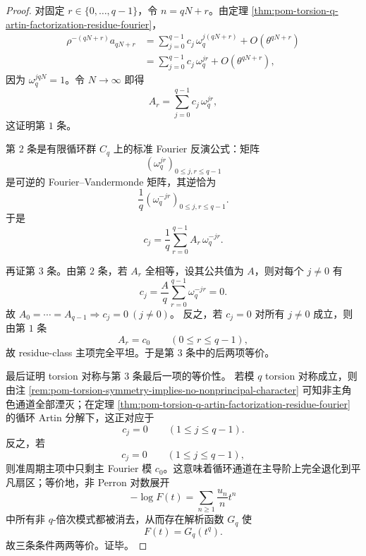 \begin{proof}
对固定 \(r\in\{0,\dots,q-1\}\)，令 \(n=qN+r\)。由定理 \ref{thm:pom-torsion-q-artin-factorization-residue-fourier}，
\[
\begin{aligned}
\rho^{-(qN+r)}a_{qN+r}
&=
\sum_{j=0}^{q-1}c_j\,\omega_q^{j(qN+r)}
+O(\theta^{qN+r})\\
&=
\sum_{j=0}^{q-1}c_j\,\omega_q^{jr}
+O(\theta^{qN+r}),
\end{aligned}
\]
因为 \(\omega_q^{jqN}=1\)。令 \(N\to\infty\) 即得
\[
A_r=\sum_{j=0}^{q-1}c_j\,\omega_q^{jr},
\]
这证明第 \(1\) 条。

第 \(2\) 条是有限循环群 \(C_q\) 上的标准 Fourier 反演公式：矩阵
\[
(\omega_q^{jr})_{0\le j,r\le q-1}
\]
是可逆的 Fourier--Vandermonde 矩阵，其逆恰为
\[
\frac1q(\omega_q^{-jr})_{0\le j,r\le q-1}.
\]
于是
\[
c_j=\frac1q\sum_{r=0}^{q-1}A_r\,\omega_q^{-jr}.
\]

再证第 \(3\) 条。由第 \(2\) 条，若 \(A_r\) 全相等，设其公共值为 \(A\)，则对每个 \(j\neq 0\) 有
\[
c_j=\frac{A}{q}\sum_{r=0}^{q-1}\omega_q^{-jr}=0.
\]
故 \(A_0=\cdots=A_{q-1}\Rightarrow c_j=0\ (j\neq0)\)。
反之，若 \(c_j=0\) 对所有 \(j\neq 0\) 成立，则由第 \(1\) 条
\[
A_r=c_0
\qquad(0\le r\le q-1),
\]
故 residue-class 主项完全平坦。于是第 \(3\) 条中的后两项等价。

最后证明 torsion 对称与第 \(3\) 条最后一项的等价性。
若模 \(q\) torsion 对称成立，则由注
\ref{rem:pom-torsion-symmetry-implies-no-nonprincipal-character}
可知非主角色通道全部湮灭；在定理
\ref{thm:pom-torsion-q-artin-factorization-residue-fourier}
的循环 Artin 分解下，这正对应于
\[
c_j=0\qquad(1\le j\le q-1).
\]
反之，若
\[
c_j=0\qquad(1\le j\le q-1),
\]
则准周期主项中只剩主 Fourier 模 \(c_0\)。这意味着循环通道在主导阶上完全退化到平凡扇区；等价地，非 Perron 对数展开
\[
-\log F(t)=\sum_{n\ge 1}\frac{u_n}{n}t^n
\]
中所有非 \(q\)-倍次模式都被消去，从而存在解析函数 \(G_q\) 使
\[
F(t)=G_q(t^q).
\]
故三条条件两两等价。证毕。
\end{proof}

\endinput
